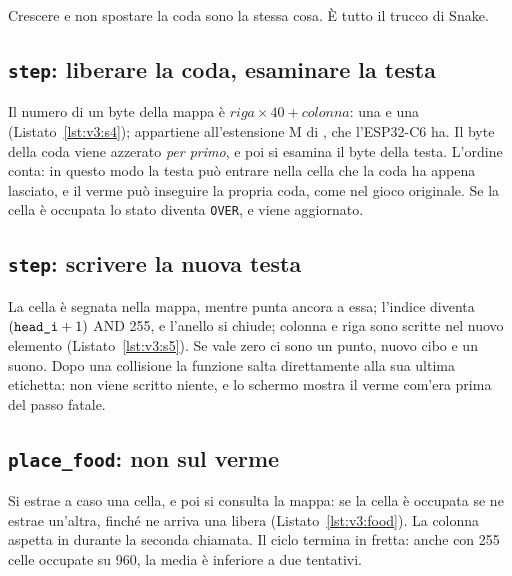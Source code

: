 \begin{prgconcept}
Crescere e non spostare la coda sono la stessa cosa. È tutto il trucco di
Snake.
\end{prgconcept}

\subsection{\texttt{step}: liberare la coda, esaminare la testa}


Il numero di un byte della mappa è
$\mathit{riga}\times 40+\mathit{colonna}$: una  e una 
(Listato~\ref{lst:v3:s4});  appartiene all'estensione M di \riscv, che
l'ESP32-C6 ha. Il byte della coda viene azzerato \emph{per primo}, e poi si
esamina il byte della testa. L'ordine conta: in questo modo la testa può
entrare nella cella che la coda ha appena lasciato, e il verme può inseguire la
propria coda, come nel gioco originale. Se la cella è occupata lo stato diventa
\texttt{OVER}, e  viene aggiornato.

\subsection{\texttt{step}: scrivere la nuova testa}


La cella è segnata nella mappa, mentre  punta ancora a essa; l'indice
 diventa $(\texttt{head\_i}+1)$ AND 255, e l'anello si chiude;
colonna e riga sono scritte nel nuovo elemento (Listato~\ref{lst:v3:s5}). Se
 vale zero ci sono un punto, nuovo cibo e un suono. Dopo una collisione
la funzione salta direttamente alla sua ultima etichetta: non viene scritto
niente, e lo schermo mostra il verme com'era prima del passo fatale.

\subsection{\texttt{place\_food}: non sul verme}


Si estrae a caso una cella, e poi si consulta la mappa: se la cella è occupata
se ne estrae un'altra, finché ne arriva una libera
(Listato~\ref{lst:v3:food}). La colonna aspetta in  durante la seconda
chiamata. Il ciclo termina in fretta: anche con 255 celle occupate su 960, la
media è inferiore a due tentativi.

